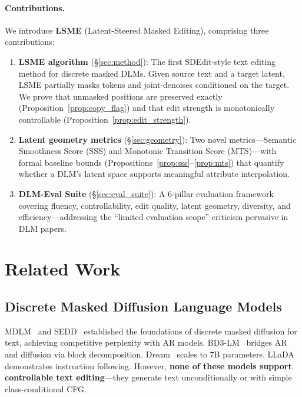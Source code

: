 \documentclass{article}
\begin{document}
\paragraph{Contributions.}
We introduce \textbf{LSME} (Latent-Steered Masked Editing), comprising three contributions:
\begin{enumerate}
    \item \textbf{LSME algorithm} (\S\ref{sec:method}): The first SDEdit-style text editing method for discrete masked DLMs. Given source text and a target latent, LSME partially masks tokens and joint-denoises conditioned on the target. We prove that unmasked positions are preserved exactly (Proposition~\ref{prop:copy_flag}) and that edit strength is monotonically controllable (Proposition~\ref{prop:edit_strength}).
    \item \textbf{Latent geometry metrics} (\S\ref{sec:geometry}): Two novel metrics---Semantic Smoothness Score (SSS) and Monotonic Transition Score (MTS)---with formal baseline bounds (Propositions~\ref{prop:sss}--\ref{prop:mts}) that quantify whether a DLM's latent space supports meaningful attribute interpolation.
    \item \textbf{DLM-Eval Suite} (\S\ref{sec:eval_suite}): A 6-pillar evaluation framework covering fluency, controllability, edit quality, latent geometry, diversity, and efficiency---addressing the ``limited evaluation scope'' criticism pervasive in DLM papers.
\end{enumerate}

\section{Related Work}
\label{sec:related}

\subsection{Discrete Masked Diffusion Language Models}

MDLM~\citep{sahoo2024} and SEDD~\citep{lou2024} established the foundations of discrete masked diffusion for text, achieving competitive perplexity with AR models.
BD3-LM~\citep{arriola2025bd3lm} bridges AR and diffusion via block decomposition.
Dream~\citep{liu2025dream} scales to 7B parameters.
LLaDA~\citep{nie2025llada} demonstrates instruction following.
However, \textbf{none of these models support controllable text editing}---they generate text unconditionally or with simple class-conditional CFG.
\end{document}
